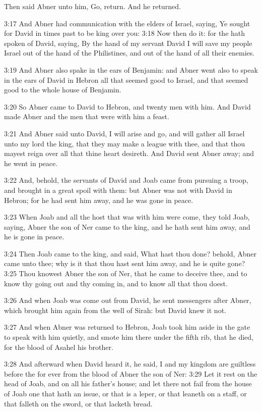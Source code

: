 Then said Abner unto him, Go, return. And he returned.

3:17 And Abner had communication with the elders of Israel, saying, Ye
sought for David in times past to be king over you: 3:18 Now then do
it: for the \LORD hath spoken of David, saying, By the hand of my
servant David I will save my people Israel out of the hand of the
Philistines, and out of the hand of all their enemies.

3:19 And Abner also spake in the ears of Benjamin: and Abner went also
to speak in the ears of David in Hebron all that seemed good to
Israel, and that seemed good to the whole house of Benjamin.

3:20 So Abner came to David to Hebron, and twenty men with him. And
David made Abner and the men that were with him a feast.

3:21 And Abner said unto David, I will arise and go, and will gather
all Israel unto my lord the king, that they may make a league with
thee, and that thou mayest reign over all that thine heart desireth.
And David sent Abner away; and he went in peace.

3:22 And, behold, the servants of David and Joab came from pursuing a
troop, and brought in a great spoil with them: but Abner was not with
David in Hebron; for he had sent him away, and he was gone in peace.

3:23 When Joab and all the host that was with him were come, they told
Joab, saying, Abner the son of Ner came to the king, and he hath sent
him away, and he is gone in peace.

3:24 Then Joab came to the king, and said, What hast thou done?
behold, Abner came unto thee; why is it that thou hast sent him away,
and he is quite gone?  3:25 Thou knowest Abner the son of Ner, that he
came to deceive thee, and to know thy going out and thy coming in, and
to know all that thou doest.

3:26 And when Joab was come out from David, he sent messengers after
Abner, which brought him again from the well of Sirah: but David knew
it not.

3:27 And when Abner was returned to Hebron, Joab took him aside in the
gate to speak with him quietly, and smote him there under the fifth
rib, that he died, for the blood of Asahel his brother.

3:28 And afterward when David heard it, he said, I and my kingdom are
guiltless before the \LORD for ever from the blood of Abner the son of
Ner: 3:29 Let it rest on the head of Joab, and on all his father's
house; and let there not fail from the house of Joab one that hath an
issue, or that is a leper, or that leaneth on a staff, or that falleth
on the sword, or that lacketh bread.

